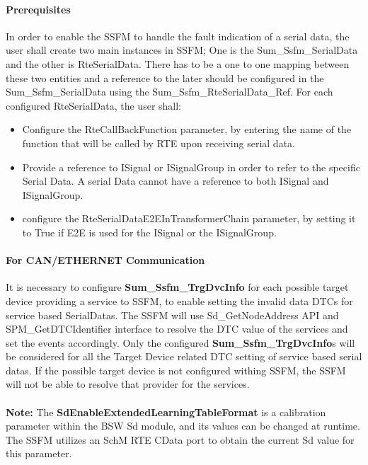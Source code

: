 \paragraph{Prerequisites}
\label{subsec:Prerequisites}
In order to enable the SSFM to handle the fault indication of a serial data, the user shall create two main instances in SSFM; One is the Sum\_Ssfm\_SerialData and the other is RteSerialData.
There has to be a one to one mapping between these two entities and a reference to the later should be configured in the Sum\_Ssfm\_SerialData using the Sum\_Ssfm\_RteSerialData\_Ref.
For each configured RteSerialData, the user shall:
\begin{itemize}
    \item Configure the RteCallBackFunction parameter, by entering the name of the function that will be called by RTE upon receiving serial data.
    \item Provide a reference to ISignal or ISignalGroup in order to refer to the specific Serial Data. A serial Data cannot have a reference to both ISignal and ISignalGroup.
    \item configure the RteSerialDataE2EInTransformerChain parameter, by setting it to True if E2E is used for the ISignal or the ISignalGroup.
\end{itemize}



\paragraph{For CAN/ETHERNET Communication}
It is necessary to configure \textbf{Sum\_Ssfm\_TrgDvcInfo} for each possible target device providing a service to SSFM, to enable setting 
the invalid data DTCs for service based SerialDatas. The SSFM will use Sd\_GetNodeAddress API and SPM\_GetDTCIdentifier interface to resolve the DTC value of the services and set the events accordingly.
Only the configured \textbf{Sum\_Ssfm\_TrgDvcInfo}s will be considered for all the Target Device related DTC setting of service based serial datas. If the possible target device is not configured
withing SSFM, the SSFM will not be able to resolve that provider for the services.
\\
\\\textbf{Note:} The \textbf{SdEnableExtendedLearningTableFormat} is a calibration parameter within the BSW Sd module, and its values can be changed at runtime. The SSFM utilizes an SchM RTE CData port to obtain the current Sd value for this parameter.

